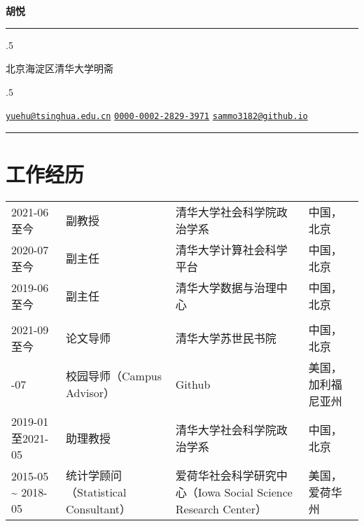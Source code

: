 \documentclass[
  12pt,
]
{article}
\begin{document}
\centerline{\huge \bf 胡悦}

\vspace{2 mm}

\hrule

\vspace{2 mm}


\moveleft.5\hoffset\centerline{北京海淀区清华大学明斋}
\moveleft.5\hoffset\centerline{ \faEnvelopeO \hspace{1 mm} \href{mailto:}{\tt yuehu@tsinghua.edu.cn} \hspace{1 mm}       \hspace{.5 mm} \href{https://orcid.org/0000-0002-2829-3971}{\tt 0000-0002-2829-3971} \hspace{1 mm}  \faGlobe \hspace{1 mm} \href{http://sammo3182@github.io}{\tt sammo3182@github.io}   }



\vspace{2 mm}

\hrule



\hypertarget{ux5de5ux4f5cux7ecfux5386}{%
\section{工作经历}\label{ux5de5ux4f5cux7ecfux5386}}

\begin{table}[!h]
\centering
\begin{tabular}{l>{\raggedright\arraybackslash}p{9em}>{\raggedright\arraybackslash}p{20em}l}

2021-06至今 & 副教授 & 清华大学社会科学院政治学系 & 中国，北京\\
2020-07至今 & 副主任 & 清华大学计算社会科学平台 & 中国，北京\\
2019-06至今 & 副主任 & 清华大学数据与治理中心 & 中国，北京\\
 &  &  & \\
2021-09至今 & 论文导师 & 清华大学苏世民书院 & 中国，北京\\
\addlinespace
2021-07 & 校园导师（Campus Advisor） & Github & 美国，加利福尼亚州\\
2019-01至2021-05 & 助理教授 & 清华大学社会科学院政治学系 & 中国，北京\\
2015-05 \textasciitilde{} 2018-05 & 统计学顾问（Statistical Consultant） & 爱荷华社会科学研究中心（Iowa Social Science Research Center） & 美国，爱荷华州\\

\end{tabular}
\end{table}
\end{document}
